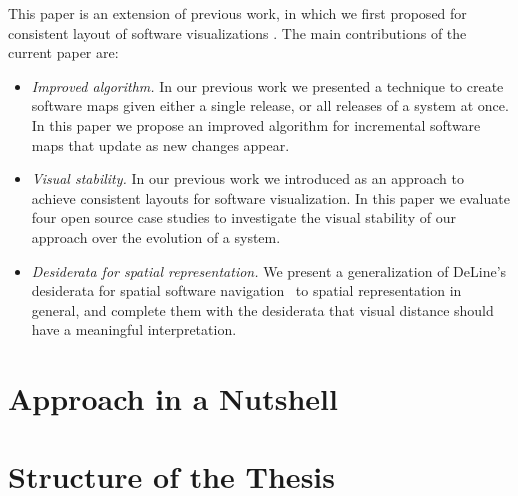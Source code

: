 This paper is an extension of previous work, in which we first proposed \emph{\SOCA} for consistent layout of software visualizations \cite{Kuhn08b}. The main contributions of the current paper are:

\begin{itemize}
\item \emph{Improved algorithm.} In our previous work we presented a technique to create software maps given either a single release, or all releases of a system at once. In this paper we propose an improved algorithm for incremental software maps that update as new changes appear.
\item \emph{Visual stability.} In our previous work we introduced \SOCA as an approach to achieve consistent layouts for software visualization. In this paper we evaluate four open source case studies to investigate the visual stability of our approach over the evolution of a system. 
\item \emph{Desiderata for spatial representation.} We present a generalization of DeLine's desiderata for spatial software navigation~\cite{Deli05b} to spatial representation in general, and complete them with the desiderata that visual distance should have a meaningful interpretation.
\end{itemize}

\section{Approach in a Nutshell}

\section{Structure of the Thesis}

